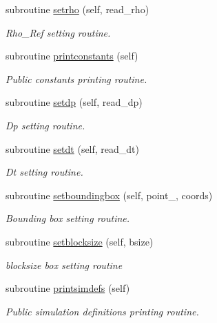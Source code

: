 \begin{DoxyCompactItemize}
subroutine \mbox{\hyperlink{namespacesimulation__globals__mod_a68a87c39cf88bad353e28e367a721ed4}{setrho}} (self, read\+\_\+rho)
\begin{DoxyCompactList}\small\item\em Rho\+\_\+\+Ref setting routine. \end{DoxyCompactList}\item 
subroutine \mbox{\hyperlink{namespacesimulation__globals__mod_a20ba28d72a9bea823d9373a94f97026e}{printconstants}} (self)
\begin{DoxyCompactList}\small\item\em Public constants printing routine. \end{DoxyCompactList}\item 
subroutine \mbox{\hyperlink{namespacesimulation__globals__mod_acb8e3762572266b40a0deb166dded33a}{setdp}} (self, read\+\_\+dp)
\begin{DoxyCompactList}\small\item\em Dp setting routine. \end{DoxyCompactList}\item 
subroutine \mbox{\hyperlink{namespacesimulation__globals__mod_aecf75eeccef4eeae6d10ab26cf2dcfcf}{setdt}} (self, read\+\_\+dt)
\begin{DoxyCompactList}\small\item\em Dt setting routine. \end{DoxyCompactList}\item 
subroutine \mbox{\hyperlink{namespacesimulation__globals__mod_a412b0779703630189e2ea14e4b390864}{setboundingbox}} (self, point\+\_\+, coords)
\begin{DoxyCompactList}\small\item\em Bounding box setting routine. \end{DoxyCompactList}\item 
subroutine \mbox{\hyperlink{namespacesimulation__globals__mod_aa65b43534d2d2b6366a4ebc791194805}{setblocksize}} (self, bsize)
\begin{DoxyCompactList}\small\item\em blocksize box setting routine \end{DoxyCompactList}\item 
subroutine \mbox{\hyperlink{namespacesimulation__globals__mod_ad331ccf019de7ed531e37c655600f90f}{printsimdefs}} (self)
\begin{DoxyCompactList}\small\item\em Public simulation definitions printing routine. \end{DoxyCompactList}\end{DoxyCompactItemize}
